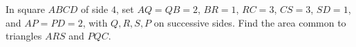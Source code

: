 In square $ABCD$ of side $4$, set $AQ=QB=2$, $BR=1$, $RC=3$, $CS=3$, $SD=1$, and $AP=PD=2$, with $Q,R,S,P$ on successive sides. Find the area common to triangles $ARS$ and $PQC$.
